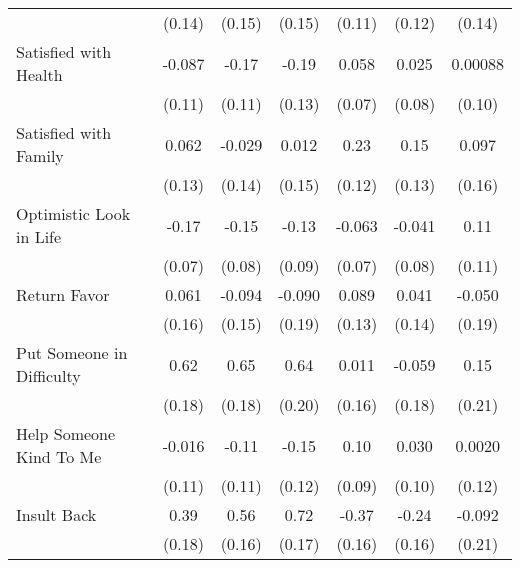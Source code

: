 {\begin{tabular}{l*{6}{c}}
            &      (0.14)         &      (0.15)         &      (0.15)         &      (0.11)         &      (0.12)         &      (0.14)         \\
\addlinespace
Satisfied with Health&      -0.087         &       -0.17         &       -0.19         &       0.058         &       0.025         &     0.00088         \\
            &      (0.11)         &      (0.11)         &      (0.13)         &      (0.07)         &      (0.08)         &      (0.10)         \\
\addlinespace
Satisfied with Family&       0.062         &      -0.029         &       0.012         &        0.23\sym{*}  &        0.15         &       0.097         \\
            &      (0.13)         &      (0.14)         &      (0.15)         &      (0.12)         &      (0.13)         &      (0.16)         \\
\addlinespace
Optimistic Look in Life&       -0.17\sym{*}  &       -0.15         &       -0.13         &      -0.063         &      -0.041         &        0.11         \\
            &      (0.07)         &      (0.08)         &      (0.09)         &      (0.07)         &      (0.08)         &      (0.11)         \\
\addlinespace
Return Favor&       0.061         &      -0.094         &      -0.090         &       0.089         &       0.041         &      -0.050         \\
            &      (0.16)         &      (0.15)         &      (0.19)         &      (0.13)         &      (0.14)         &      (0.19)         \\
\addlinespace
Put Someone in Difficulty&        0.62\sym{***}&        0.65\sym{***}&        0.64\sym{**} &       0.011         &      -0.059         &        0.15         \\
            &      (0.18)         &      (0.18)         &      (0.20)         &      (0.16)         &      (0.18)         &      (0.21)         \\
\addlinespace
Help Someone Kind To Me&      -0.016         &       -0.11         &       -0.15         &        0.10         &       0.030         &      0.0020         \\
            &      (0.11)         &      (0.11)         &      (0.12)         &      (0.09)         &      (0.10)         &      (0.12)         \\
\addlinespace
Insult Back &        0.39\sym{*}  &        0.56\sym{***}&        0.72\sym{***}&       -0.37\sym{*}  &       -0.24         &      -0.092         \\
            &      (0.18)         &      (0.16)         &      (0.17)         &      (0.16)         &      (0.16)         &      (0.21)         \\
\bottomrule
\end{tabular}
}
